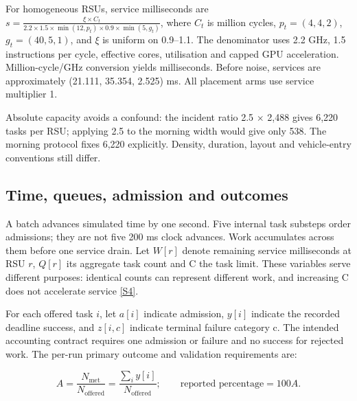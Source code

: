 \documentclass[11pt,a4paper]{article}
\begin{document}
For homogeneous RSUs, service milliseconds are $s = \frac{\xi \times C_t}{2.2 \times 1.5 \times \min(12,p_t) \times 0.9 \times \min(5,g_t)}$, where $C_t$ is million cycles, $p_t=(4,4,2)$, $g_t=(40,5,1)$, and \ensuremath{\xi} is uniform on 0.9--1.1. The denominator uses 2.2 GHz, 1.5 instructions per cycle, effective cores, utilisation and capped GPU acceleration. Million-cycle/GHz conversion yields milliseconds. Before noise, services are approximately (21.111, 35.354, 2.525) ms. All placement arms use service multiplier 1.

Absolute capacity avoids a confound: the incident ratio 2.5 \ensuremath{\times} 2,488 gives 6,220 tasks per RSU; applying 2.5 to the morning width would give only 538. The morning protocol fixes 6,220 explicitly. Density, duration, layout and vehicle-entry conventions still differ.

\subsection{Time, queues, admission and outcomes}\label{sec:2.4}

A batch advances simulated time by one second. Five internal task substeps order admissions; they are not five 200 ms clock advances. Work accumulates across them before one service drain. Let $W[r]$ denote remaining service milliseconds at RSU $r$, $Q[r]$ its aggregate task count and C the task limit. These variables serve different purposes: identical counts can represent different work, and increasing C does not accelerate service \hyperref[source-s4]{[S4]}.

For each offered task $i$, let $a[i]$ indicate admission, $y[i]$ indicate the recorded deadline success, and $z[i,c]$ indicate terminal failure category c. The intended accounting contract requires one admission or failure and no success for rejected work. The per-run primary outcome and validation requirements are:

\begin{equation}\label{eq:1}
 A=\frac{N_{\mathrm{met}}}{N_{\mathrm{offered}}}
  =\frac{\sum_i y[i]}{N_{\mathrm{offered}}};
 \qquad \text{reported percentage}=100A.
\end{equation}
\end{document}
